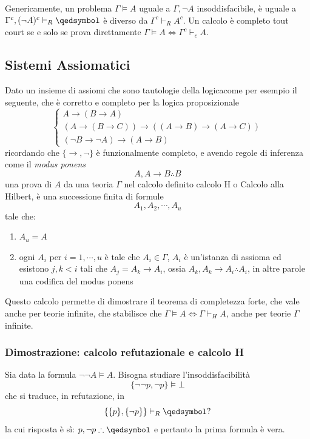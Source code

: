 Genericamente, un problema $\Gamma \models A$ uguale a $\Gamma, \neg A$ insoddisfacibile, 
è uguale a $\Gamma ^c, (\neg A)^c \vdash_R \qedsymbol$ è diverso da 
$\Gamma^c \vdash_R A^c$. Un calcolo è completo tout court se e solo se 
prova direttamente $\Gamma \models A \iff \Gamma^c \vdash_c A$.

\subsection{Sistemi Assiomatici}
Dato un insieme di assiomi che sono tautologie della logicacome per esempio 
il seguente, che è corretto e completo per la logica proposizionale
$$
\begin{cases}
        A \rightarrow (B \rightarrow A) \\
        (A \rightarrow (B \rightarrow C)) \rightarrow ((A \rightarrow B) \rightarrow (A \rightarrow C)) \\
        ( \neg B \rightarrow \neg A) \rightarrow (A \rightarrow B) 
\end{cases}
$$
ricordando che $\{\rightarrow, \neg\}$ è funzionalmente completo, e 
avendo regole di inferenza come il \textit{modus ponens} 
$$
A , A \rightarrow B \therefore B
$$
una prova di $A$ da una teoria $\Gamma$ nel calcolo definito calcolo H o 
Calcolo alla Hilbert, è una successione finita di formule 
$$
A_1, A_2, \cdots, A_u
$$
tale che: 
\begin{enumerate}
        \item $A_u = A$ 
        \item ogni $A_i$ per $i = 1, \cdots, u$ è tale che 
        $A_i \in \Gamma$, $A_i$ è un'istanza di assioma ed 
        esistono $j,k < i$ tali che $A_j = A_k \rightarrow A_i$, 
        ossia $A_k, A_k \rightarrow A_i \therefore A_i$, 
        in altre parole una codifica del modus ponens
\end{enumerate}

Questo calcolo permette di dimostrare il teorema di completezza forte, che 
vale anche per teorie infinite, che stabilisce che $\Gamma \models A \iff \Gamma \vdash_H A$, 
anche per teorie $\Gamma$ infinite. 

\subsubsection{Dimostrazione: calcolo refutazionale e calcolo H}
Sia data la formula $\neg \neg A \models A$. Bisogna studiare l'insoddisfacibilità 
$$
\{ \neg \neg p, \neg p\} \models \bot
$$
che si traduce, in refutazione, in 
$$
\{\{p\}, \{\neg p \}\} \vdash_R \qedsymbol ?
$$
la cui risposta è sì: $p, \neg p \therefore \qedsymbol$ e pertanto la prima 
formula è vera. 

